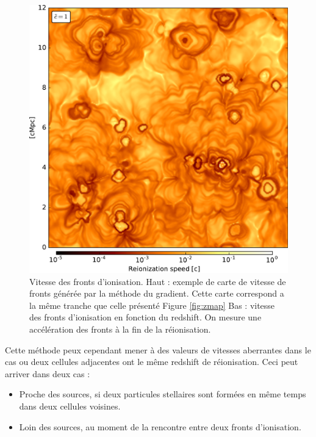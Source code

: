 \begin{figure}
        \includegraphics[width=.95\linewidth]{img/04_mapreio/map_v_c1.pdf} 
        
        \caption[Vitesse des fronts d'ionisation]{Vitesse des fronts d'ionisation.
        Haut : exemple de carte de vitesse de fronts générée par la méthode du gradient.
		Cette carte correspond a la même tranche que celle présenté Figure \ref{fig:zmap}
		Bas : vitesse des fronts d'ionisation en fonction du redshift.
        On mesure une accélération des fronts à la fin de la réionisation.
        }
 		\label{fig:vmap}
\end{figure}

Cette méthode peux cependant mener à des valeurs de vitesses aberrantes dans le cas ou deux cellules adjacentes ont le même redshift de réionisation.
Ceci peut arriver dans deux cas : 
\begin{itemize}
\item Proche des sources, si deux particules stellaires sont formées en même temps dans deux cellules voisines.
\item Loin des sources, au moment de la rencontre entre deux fronts d'ionisation.
\end{itemize}

